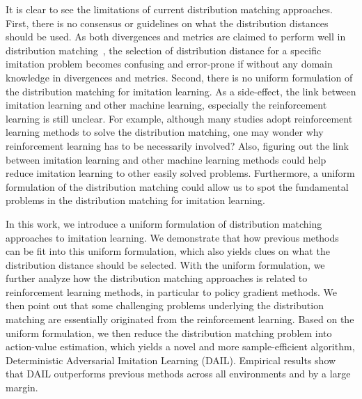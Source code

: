 It is clear to see the limitations of current distribution matching approaches.
First, there is no consensus or guidelines on what the distribution distances should be used. 
As both divergences and metrics are claimed to perform well in distribution matching~\citep{ke2019imitation,ghasemipour2020divergence,xiao2019wasserstein}, the selection of distribution distance for a specific imitation problem becomes confusing and error-prone if without any domain knowledge in divergences and metrics.
Second, there is no uniform formulation of the distribution matching for imitation learning.
As a side-effect, the link between imitation learning and other machine learning, especially the reinforcement learning is still unclear.
For example, although many studies adopt reinforcement learning methods to solve the distribution matching, 
one may wonder why reinforcement learning has to be necessarily involved?
Also, figuring out the link between imitation learning and other machine learning methods could help reduce imitation learning to other easily solved problems. 
Furthermore, a uniform formulation of the distribution matching could allow us to spot the fundamental problems in the distribution matching for imitation learning. 


In this work, we introduce a uniform formulation of distribution matching approaches to imitation learning. 
We demonstrate that how previous methods can be fit into this uniform formulation, 
which also yields clues on what the distribution distance should be selected. 
With the uniform formulation, we further analyze how the distribution matching approaches is related to reinforcement learning methods, in particular to policy gradient methods. 
We then point out that some challenging problems underlying the distribution matching are essentially originated from the reinforcement learning. 
Based on the uniform formulation, we then reduce the distribution matching problem into action-value estimation, which yields a novel and more sample-efficient algorithm, Deterministic Adversarial Imitation Learning (DAIL). 
Empirical results show that DAIL outperforms previous methods across all environments and by a large margin. 
